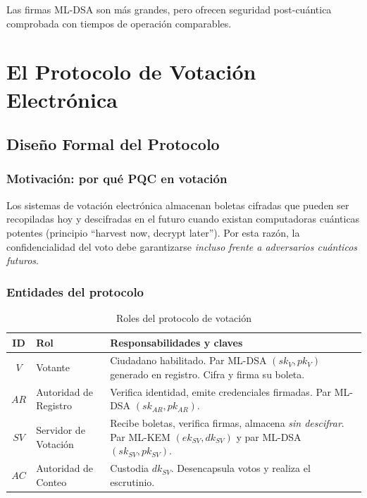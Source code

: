 \documentclass[12pt,a4paper,twoside,openright]{book}
\theoremstyle{plain}
\theoremstyle{definition}
\theoremstyle{remark}
\begin{document}
Las firmas ML-DSA son m\'as grandes, pero ofrecen seguridad post-cu\'antica
comprobada con tiempos de operaci\'on comparables.

\part{El Protocolo de Votaci\'on Electr\'onica}

\chapter{Dise\~no Formal del Protocolo}
\label{chap:protocolo}

\section{Motivaci\'on: por qu\'e PQC en votaci\'on}

Los sistemas de votaci\'on electr\'onica almacenan boletas cifradas que
pueden ser recopiladas hoy y descifradas en el futuro cuando existan
computadoras cu\'anticas potentes (principio ``harvest now, decrypt later'').
Por esta raz\'on, la confidencialidad del voto debe garantizarse
\emph{incluso frente a adversarios cu\'anticos futuros}.

\section{Entidades del protocolo}

\begin{table}[H]
\centering
\caption{Roles del protocolo de votaci\'on}
\label{tab:roles}
\begin{tabular}{clp{7.5cm}}
\toprule
\textbf{ID} & \textbf{Rol} & \textbf{Responsabilidades y claves} \\
\midrule
$V$ & Votante &
  Ciudadano habilitado. Par ML-DSA $(sk_V, pk_V)$ generado en registro.
  Cifra y firma su boleta. \\
\addlinespace
$AR$ & Autoridad de Registro &
  Verifica identidad, emite credenciales firmadas. Par ML-DSA
  $(sk_{AR}, pk_{AR})$. \\
\addlinespace
$SV$ & Servidor de Votaci\'on &
  Recibe boletas, verifica firmas, almacena \emph{sin descifrar}.
  Par ML-KEM $(ek_{SV}, dk_{SV})$ y par ML-DSA $(sk_{SV}, pk_{SV})$. \\
\addlinespace
$AC$ & Autoridad de Conteo &
  Custodia $dk_{SV}$. Desencapsula votos y realiza el escrutinio. \\
\bottomrule
\end{tabular}
\end{table}
\end{document}
